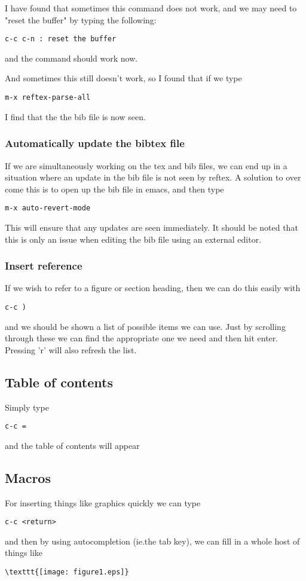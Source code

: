 \documentclass[a4paper, 10pt]{article}
\begin{document}
I have found that sometimes this command does not work, and we may
need to "reset the buffer" by typing the following:
\begin{verbatim}
c-c c-n : reset the buffer
\end{verbatim}
and the command should work now.

And sometimes this still doesn't work, so I found that if we type
\begin{verbatim}
m-x reftex-parse-all
\end{verbatim}
I find that the the bib file is now seen.


\subsubsection*{Automatically update the bibtex file}
\label{sec:autom-update-bibt}

If we are simultaneously working on the tex and bib files, we can end
up in a situation where an update in the bib file is not seen by
reftex. A solution to over come this is to open up the bib file in
emacs, and then type 
\begin{verbatim}
m-x auto-revert-mode
\end{verbatim}
This will ensure that any updates are seen immediately. It should be
noted that this is only an issue when editing the bib file using an
external editor. 


\subsubsection{Insert reference}
\label{sec:insert-reference}

If we wish to refer to a figure or section heading, then we can do
this easily with 
\begin{verbatim}
c-c )
\end{verbatim}
and we should be shown a list of possible items we can use. Just by
scrolling through these we can find the appropriate one we need and
then hit enter. Pressing 'r' will also refresh the list.


\subsection*{Table of contents}

Simply type
\begin{verbatim}
c-c =
\end{verbatim}
and the table of contents will appear
 
\subsection*{Macros}

For inserting things like graphics quickly we can type
\begin{verbatim}
c-c <return>
\end{verbatim}
and then by using autocompletion (ie.the tab key), we can fill in a whole host of things like 
\begin{verbatim}
\texttt{[image: figure1.eps]}
\end{verbatim}
\end{document}
